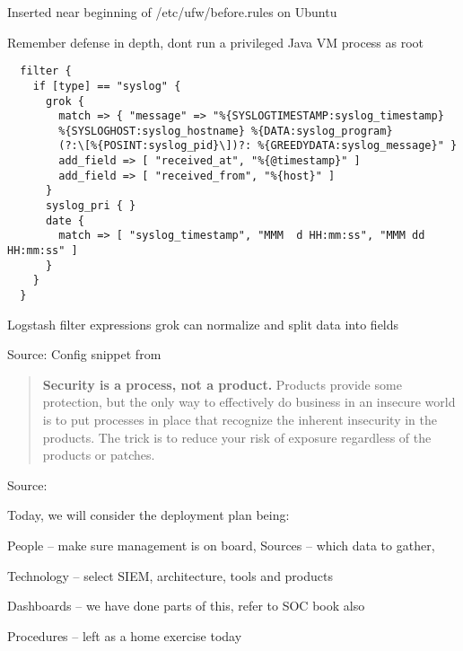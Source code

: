 \documentclass[Screen16to9,17pt]{foils}
\begin{document}
\centerline{Inserted near beginning of /etc/ufw/before.rules on Ubuntu}

Remember defense in depth, dont run a privileged Java VM process as root \smiley


{\footnotesize
\begin{verbatim}
  filter {
    if [type] == "syslog" {
      grok {
        match => { "message" => "%{SYSLOGTIMESTAMP:syslog_timestamp}
        %{SYSLOGHOST:syslog_hostname} %{DATA:syslog_program}
        (?:\[%{POSINT:syslog_pid}\])?: %{GREEDYDATA:syslog_message}" }
        add_field => [ "received_at", "%{@timestamp}" ]
        add_field => [ "received_from", "%{host}" ]
      }
      syslog_pri { }
      date {
        match => [ "syslog_timestamp", "MMM  d HH:mm:ss", "MMM dd HH:mm:ss" ]
      }
    }
  }
\end{verbatim}
}

\begin{list2}
\item Logstash filter expressions grok can normalize and split data into fields
\end{list2}

Source:
Config snippet from\\
{\small{}}







\begin{quote}{\bf
Security is a process, not a product.} Products provide some protection, but the only way to effectively do business in an insecure world is to put processes in place that recognize the inherent insecurity in the products. The trick is to reduce your risk of exposure regardless of the products or patches.
\end{quote}
Source: 

Today, we will consider the deployment plan being:
\begin{list2}
\item People -- make sure management is on board, Sources -- which data to gather,
\item Technology -- select SIEM, architecture, tools and products
\item Dashboards -- we have done parts of this, refer to SOC book also
\item Procedures -- left as a home exercise today
\end{list2}
\end{document}

